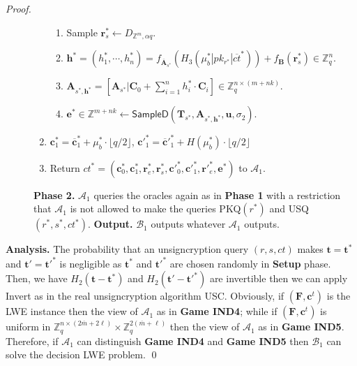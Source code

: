 \documentclass[a4paper,11pt,onecolumn]{elsarticle}
\begin{document}
\begin{proof}
\begin{description}
\begin{enumerate}
\begin{enumerate}
	\item Sample $\textbf{r}^*_s\leftarrow D_{\mathbb{Z}^{m }, \alpha q}$.	%
	\item $\textbf{h}^*=(h^*_1, \cdots, h^*_n)=f_{\overline{\textbf{A}}_{s^*}}(H_3(\mu^*_b| pk_{r^*}|\overline{ct}^*))+f_{\textbf{B}}(\textbf{r}^*_{s})\in \mathbb{Z}_q^{n}$.
	\item $\textbf{A}_{s^*,\textbf{h}^*}=[\mathbf{A}_{s^*}|\mathbf{C}_0+\sum_{i=1}^{n}h^*_i\cdot \mathbf{C}_i]\in \mathbb{Z}_q^{n \times (m+nk)}$.
	\item $\textbf{e}^* \in \mathbb{Z}^{m+nk} \leftarrow \textsf{SampleD}(\textbf{T}_{s^*}, \textbf{A}_{s^*,\textbf{h}^*},\textbf{u},\sigma_2)$.
							\end{enumerate}
							\fi	
	\item  $\textbf{c}^*_1=\overline{\textbf{c}}^*_1+ \mu^*_b \cdot \lfloor q/2\rfloor$, \quad  $\textbf{c}'^*_1=\overline{\textbf{c}}'^*_1+ H(\mu^*_b) \cdot \lfloor q/2\rfloor$	
	 
			\item Return $ct^*=(\textbf{c}^*_0, \textbf{c}^*_1, \textbf{r}^*_{e},\textbf{r}^*_{s},\textbf{c}'^*_0, \textbf{c}'^*_1,\textbf{r}'^*_e, \textbf{e}^*)$ to $\mathcal{A}_1$.
		
				\end{enumerate}

 	 \textbf{Phase 2.} $\mathcal{A}_1$ queries the oracles again as in \textbf{Phase 1} with a restriction that $\mathcal{A}_1$ is not allowed to make the queries PKQ$(r^*)$ and   USQ$(r^*,s^*, ct^*)$.
	 \textbf{Output.} $\mathcal{B}_1$ outputs whatever $\mathcal{A}_1$  outputs.
			 			
	\end{description}
	  \textbf{Analysis.} The probability that an unsigncryption query $(r,s,ct)$ makes $\textbf{t}=\textbf{t}^*$ and $\textbf{t}'=\textbf{t}'^*$ is negligible as $\textbf{t}^*$ and $\textbf{t}'^*$ are chosen randomly in \textbf{Setup} phase. Then, we have $H_2(\textbf{t}-\textbf{t}^*)$ and $H_2(\textbf{t}'-\textbf{t}'^*)$ are invertible then we can apply \textsf{Invert} as in the real unsigncryption algorithm \textsf{USC}.  Obviously, if $(\textbf{F},\textbf{c}^t)$ is the LWE instance then the view of $\mathcal{A}_1$ as in \textbf{Game IND4}; while if $(\textbf{F},\textbf{c}^t)$ is uniform in $\mathbb{Z}_q^{n \times (2\overline{ m}+2\ell)} \times \mathbb{Z}_q^{2(\overline{m}+\ell)}$ then the view of $\mathcal{A}_1$ as in \textbf{Game IND5}. Therefore, if $\mathcal{A}_1$ can distinguish \textbf{Game IND4} and \textbf{Game IND5} then $\mathcal{B}_1$ can solve the decision LWE problem. \qed	
		
	
	\end{proof}
	
\end{document}
